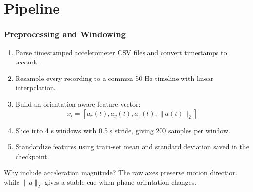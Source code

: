 \section{Pipeline}

\begin{frame}
	\frametitle{Preprocessing and Windowing}
	\begin{enumerate}
		\item Parse timestamped accelerometer CSV files and convert timestamps to seconds.
		\item Resample every recording to a common 50 Hz timeline with linear interpolation.
		\item Build an orientation-aware feature vector:
		\[
			x_t = [a_x(t), a_y(t), a_z(t), \|a(t)\|_2]
		\]
		\item Slice into 4 s windows with 0.5 s stride, giving 200 samples per window.
		\item Standardize features using train-set mean and standard deviation saved in the checkpoint.
	\end{enumerate}

	\begin{block}{Why include acceleration magnitude?}
		The raw axes preserve motion direction, while $\|a\|_2$ gives a stable cue when phone orientation changes.
	\end{block}
\end{frame}